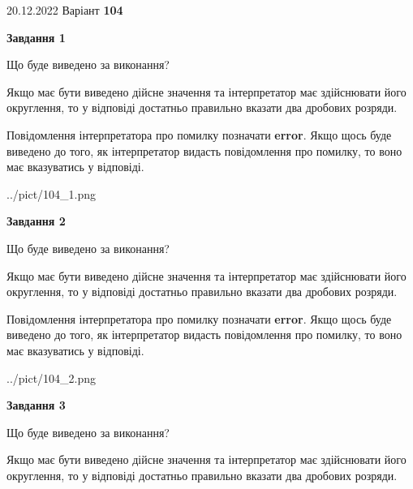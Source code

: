 \documentclass[12pt, ukrainian]{article}
\begin{document}
{20.12.2022 Варіант \No \textbf { 104 }\par}
{
\begin {Large}

{\begin {center}\textbf{Завдання 1}\end {center}}\par
Що буде виведено за виконання? \par

Якщо має бути виведено дійсне значення та інтерпретатор має здійснювати його округлення, 
то у відповіді достатньо правильно вказати два дробових розряди.

Повідомлення інтерпретатора про помилку позначати \textbf{error}.
Якщо щось буде виведено до того, як інтерпретатор видасть повідомлення про помилку, 
то воно має вказуватись у відповіді. \par

\begin{center}
	{../pict/104_1.png}
\end{center}
\newpage

{\begin {center}\textbf{Завдання 2}\end {center}}\par
Що буде виведено за виконання? \par

Якщо має бути виведено дійсне значення та інтерпретатор має здійснювати його округлення, 
то у відповіді достатньо правильно вказати два дробових розряди.

Повідомлення інтерпретатора про помилку позначати \textbf{error}.
Якщо щось буде виведено до того, як інтерпретатор видасть повідомлення про помилку, 
то воно має вказуватись у відповіді. \par

\begin{center}
	{../pict/104_2.png}
\end{center}
\newpage

{\begin {center}\textbf{Завдання 3}\end {center}}\par
Що буде виведено за виконання? \par

Якщо має бути виведено дійсне значення та інтерпретатор має здійснювати його округлення, 
то у відповіді достатньо правильно вказати два дробових розряди.


\end{Large}}
\end{document}
